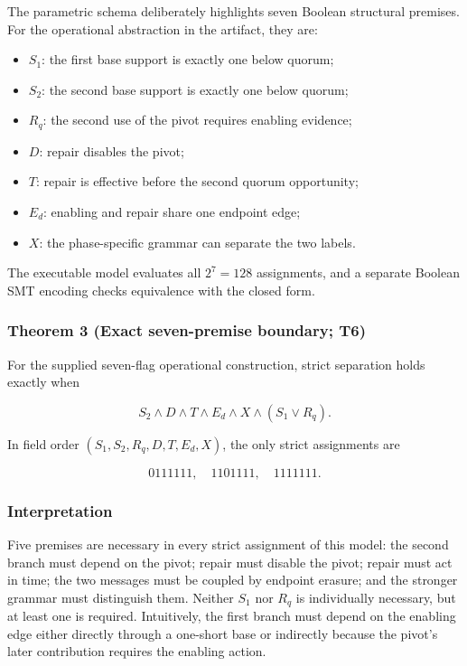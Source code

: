 \documentclass[10pt,a4paper]{article}
\newcommand{\tightlist}{\setlength{\itemsep}{0pt}\setlength{\parskip}{0pt}}
\begin{document}
The parametric schema deliberately highlights seven Boolean structural
premises. For the operational abstraction in the artifact, they are:

\begin{itemize}
\tightlist
\item
  \(S_1\): the first base support is exactly one below quorum;
\item
  \(S_2\): the second base support is exactly one below quorum;
\item
  \(R_q\): the second use of the pivot requires enabling evidence;
\item
  \(D\): repair disables the pivot;
\item
  \(T\): repair is effective before the second quorum opportunity;
\item
  \(E_d\): enabling and repair share one endpoint edge;
\item
  \(X\): the phase-specific grammar can separate the two labels.
\end{itemize}

The executable model evaluates all \(2^7=128\) assignments, and a
separate Boolean SMT encoding checks equivalence with the closed form.

\subsubsection{Theorem 3 (Exact seven-premise boundary;
T6)}\label{theorem-3-exact-seven-premise-boundary-t6}

For the supplied seven-flag operational construction, strict separation
holds exactly when

\[
S_2\land D\land T\land E_d\land X\land(S_1\lor R_q).
\]

In field order \((S_1,S_2,R_q,D,T,E_d,X)\), the only strict assignments
are

\[
0111111,\quad1101111,\quad1111111.
\]

\subsubsection{Interpretation}\label{interpretation}

Five premises are necessary in every strict assignment of this model:
the second branch must depend on the pivot; repair must disable the
pivot; repair must act in time; the two messages must be coupled by
endpoint erasure; and the stronger grammar must distinguish them.
Neither \(S_1\) nor \(R_q\) is individually necessary, but at least one
is required. Intuitively, the first branch must depend on the enabling
edge either directly through a one-short base or indirectly because the
pivot's later contribution requires the enabling action.
\end{document}
